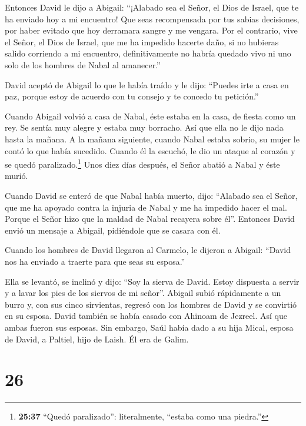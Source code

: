  Entonces David le dijo a Abigail: ``¡Alabado sea el Señor,
el Dios de Israel, que te ha enviado hoy a mi encuentro! 
Que seas recompensada por tus sabias decisiones, por haber evitado que
hoy derramara sangre y me vengara.  Por el contrario, vive
el Señor, el Dios de Israel, que me ha impedido hacerte daño, si no
hubieras salido corriendo a mi encuentro, definitivamente no habría
quedado vivo ni uno solo de los hombres de Nabal al amanecer.''

 David aceptó de Abigail lo que le había traído y le dijo:
``Puedes irte a casa en paz, porque estoy de acuerdo con tu consejo y te
concedo tu petición.''

 Cuando Abigail volvió a casa de Nabal, éste estaba en la
casa, de fiesta como un rey. Se sentía muy alegre y estaba muy borracho.
Así que ella no le dijo nada hasta la mañana.  A la mañana
siguiente, cuando Nabal estaba sobrio, su mujer le contó lo que había
sucedido. Cuando él la escuchó, le dio un ataque al corazón y se quedó
paralizado.\footnote{\textbf{25:37} ``Quedó paralizado'': literalmente,
  ``estaba como una piedra.''}  Unos diez días después, el
Señor abatió a Nabal y éste murió.

 Cuando David se enteró de que Nabal había muerto, dijo:
``Alabado sea el Señor, que me ha apoyado contra la injuria de Nabal y
me ha impedido hacer el mal. Porque el Señor hizo que la maldad de Nabal
recayera sobre él''. Entonces David envió un mensaje a Abigail,
pidiéndole que se casara con él.

 Cuando los hombres de David llegaron al Carmelo, le
dijeron a Abigail: ``David nos ha enviado a traerte para que seas su
esposa.''

 Ella se levantó, se inclinó y dijo: ``Soy la sierva de
David. Estoy dispuesta a servir y a lavar los pies de los siervos de mi
señor''.  Abigail subió rápidamente a un burro y, con sus
cinco sirvientas, regresó con los hombres de David y se convirtió en su
esposa.  David también se había casado con Ahinoam de
Jezreel. Así que ambas fueron sus esposas.  Sin embargo,
Saúl había dado a su hija Mical, esposa de David, a Paltiel, hijo de
Laish. Él era de Galim.

\hypertarget{section-25}{%
\section{26}\label{section-25}}

